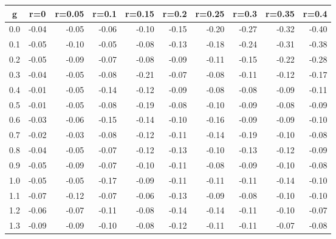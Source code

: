 %
\begin{table}[!tbp]
 \begin{center}
 \begin{tabular}{rrrrrrrrrr}\hline\hline
\multicolumn{1}{c}{g}&\multicolumn{1}{c}{r=0}&\multicolumn{1}{c}{r=0.05}&\multicolumn{1}{c}{r=0.1}&\multicolumn{1}{c}{r=0.15}&\multicolumn{1}{c}{r=0.2}&\multicolumn{1}{c}{r=0.25}&\multicolumn{1}{c}{r=0.3}&\multicolumn{1}{c}{r=0.35}&\multicolumn{1}{c}{r=0.4}\tabularnewline
\hline
0.0&-0.04&-0.05&-0.06&-0.10&-0.15&-0.20&-0.27&-0.32&-0.40\tabularnewline
0.1&-0.05&-0.10&-0.05&-0.08&-0.13&-0.18&-0.24&-0.31&-0.38\tabularnewline
0.2&-0.05&-0.09&-0.07&-0.08&-0.09&-0.11&-0.15&-0.22&-0.28\tabularnewline
0.3&-0.04&-0.05&-0.08&-0.21&-0.07&-0.08&-0.11&-0.12&-0.17\tabularnewline
0.4&-0.01&-0.05&-0.14&-0.12&-0.09&-0.08&-0.08&-0.09&-0.11\tabularnewline
0.5&-0.01&-0.05&-0.08&-0.19&-0.08&-0.10&-0.09&-0.08&-0.09\tabularnewline
0.6&-0.03&-0.06&-0.15&-0.14&-0.10&-0.16&-0.09&-0.09&-0.10\tabularnewline
0.7&-0.02&-0.03&-0.08&-0.12&-0.11&-0.14&-0.19&-0.10&-0.08\tabularnewline
0.8&-0.04&-0.05&-0.07&-0.12&-0.13&-0.10&-0.13&-0.12&-0.09\tabularnewline
0.9&-0.05&-0.09&-0.07&-0.10&-0.11&-0.08&-0.09&-0.10&-0.08\tabularnewline
1.0&-0.05&-0.05&-0.17&-0.09&-0.11&-0.11&-0.11&-0.14&-0.10\tabularnewline
1.1&-0.07&-0.12&-0.07&-0.06&-0.13&-0.09&-0.08&-0.10&-0.10\tabularnewline
1.2&-0.06&-0.07&-0.11&-0.08&-0.14&-0.14&-0.11&-0.10&-0.07\tabularnewline
1.3&-0.09&-0.09&-0.10&-0.08&-0.12&-0.11&-0.11&-0.07&-0.08\tabularnewline
\hline
\end{tabular}

\end{center}

\end{table}

